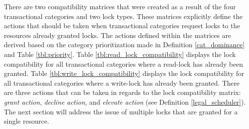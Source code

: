 There are two compatibility matrices that were created as a result of the four transactional categories and two lock types. These matrices explicitly define the actions that should be taken when transactional categories request locks to the resources already granted locks. The actions defined within the matrices are derived based on the category prioritization made in Definition \ref{cat_dominance} and Table \ref{tbl:priority}. Table \ref{tbl:read_lock_compatibility} displays the lock compatibility for all transactional categories where a read-lock has already been granted. Table \ref{tbl:write_lock_compatibility} displays the lock compatibility for all transactional categories where a write-lock has already been granted. There are three actions that can be taken in regards to the lock compatibility matrix: \textit{grant action}, \textit{decline action}, and \textit{elevate action} (see Definition \ref{legal_scheduler}). The next section will address the issue of multiple locks that are granted for a single resource.